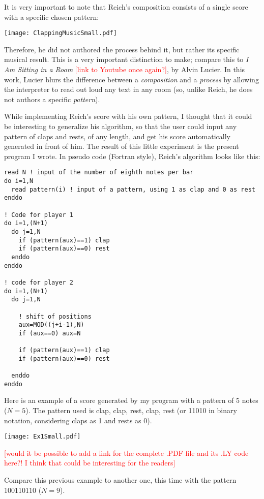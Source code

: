 \documentclass{article}
\begin{document}
It is very important to note that Reich's composition consists of a single score with a specific chosen pattern:

\texttt{[image: ClappingMusicSmall.pdf]}

Therefore, he did not authored the process behind it, but rather its specific musical result. 
This is a very important distinction to make; compare this to \textit{I Am Sitting in a Room}
\textcolor{red}{[link to Youtube once again?]}, by Alvin Lucier. 
In this work, Lucier blurs the difference between a \textit{composition} and a \textit{process} by allowing
the interpreter to read out loud any text in any room (so, unlike Reich, he does not authors a specific
\textit{pattern}). 

While implementing Reich's score with his own pattern, I thought that it could be interesting to generalize
his algorithm, so that the user could input any pattern of claps and rests, of any length, and get his score
automatically generated in front of him. 
The result of this little experiment is the present program I wrote. 
In pseudo code (Fortran style), Reich's algorithm looks like this:

\begin{verbatim}
read N ! input of the number of eighth notes per bar
do i=1,N
  read pattern(i) ! input of a pattern, using 1 as clap and 0 as rest
enddo

! Code for player 1
do i=1,(N+1)
  do j=1,N
    if (pattern(aux)==1) clap
    if (pattern(aux)==0) rest
  enddo
enddo

! code for player 2
do i=1,(N+1)
  do j=1,N

    ! shift of positions
    aux=MOD((j+i-1),N)
    if (aux==0) aux=N

    if (pattern(aux)==1) clap
    if (pattern(aux)==0) rest

  enddo
enddo
\end{verbatim}

Here is an example of a score generated by my program with a pattern of 5 notes ($N=5$). 
The pattern used is clap, clap, rest, clap, rest (or 11010 in binary notation, considering claps as 1 and rests
as 0).

\texttt{[image: Ex1Small.pdf]}

\textcolor{red}{[would it be possible to add a link for the complete .PDF file and its .LY code here?!
I think that could be interesting for the readers]}

Compare this previous example to another one, this time with the pattern 100110110 ($N=9$).
\end{document}
